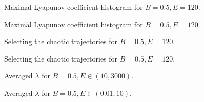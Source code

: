 \documentclass{beamer}
\begin{document}
\begin{frame}
	\begin{figure}
		
		\caption{Maximal Lyapunov coefficient histogram for \(B=0.5, E=120\).}
	\end{figure}
\end{frame}


\begin{frame}
	\begin{figure}
		
		\caption{Maximal Lyapunov coefficient histogram for \(B=0.5, E=120\).}
	\end{figure}
\end{frame}


\begin{frame}
	\begin{figure}
		
		\caption{Selecting the chaotic trajectories for \(B=0.5, E=120\).}
	\end{figure}
\end{frame}


\begin{frame}
	\begin{figure}
		
		\caption{Selecting the chaotic trajectories for \(B=0.5, E=120\).}
	\end{figure}
\end{frame}


\begin{frame}
	\begin{figure}
		
		\caption{Averaged \(\lambda\) for \(B=0.5, E \in (10, 3000)\).}
	\end{figure}
\end{frame}


\begin{frame}
	\begin{figure}
		
		\caption{Averaged \(\lambda\) for \(B=0.5, E \in (0.01, 10)\).}
	\end{figure}
\end{frame}
\end{document}
